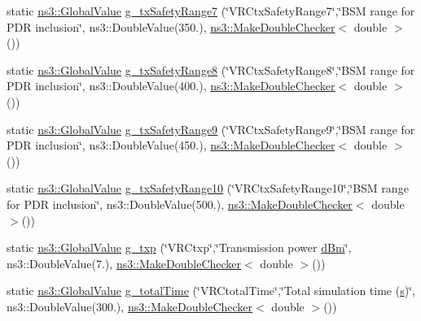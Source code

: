 \begin{DoxyCompactItemize}
\item 
static \hyperlink{classns3_1_1GlobalValue}{ns3\+::\+Global\+Value} \hyperlink{vanet-routing-compare_8cc_ac10de320e772d4158f5d1351ab282389}{g\+\_\+tx\+Safety\+Range7} (\char`\"{}V\+R\+Ctx\+Safety\+Range7\char`\"{},\char`\"{}B\+SM range for P\+DR inclusion\char`\"{}, ns3\+::\+Double\+Value(350.), \hyperlink{namespacens3_a0f8000e7b66dd988358648f0b16c7709}{ns3\+::\+Make\+Double\+Checker}$<$ double $>$())
\item 
static \hyperlink{classns3_1_1GlobalValue}{ns3\+::\+Global\+Value} \hyperlink{vanet-routing-compare_8cc_a920d83af661bf1ffdba301d10b2246fc}{g\+\_\+tx\+Safety\+Range8} (\char`\"{}V\+R\+Ctx\+Safety\+Range8\char`\"{},\char`\"{}B\+SM range for P\+DR inclusion\char`\"{}, ns3\+::\+Double\+Value(400.), \hyperlink{namespacens3_a0f8000e7b66dd988358648f0b16c7709}{ns3\+::\+Make\+Double\+Checker}$<$ double $>$())
\item 
static \hyperlink{classns3_1_1GlobalValue}{ns3\+::\+Global\+Value} \hyperlink{vanet-routing-compare_8cc_a6478672cb0ee8121ed2a8aefb62626aa}{g\+\_\+tx\+Safety\+Range9} (\char`\"{}V\+R\+Ctx\+Safety\+Range9\char`\"{},\char`\"{}B\+SM range for P\+DR inclusion\char`\"{}, ns3\+::\+Double\+Value(450.), \hyperlink{namespacens3_a0f8000e7b66dd988358648f0b16c7709}{ns3\+::\+Make\+Double\+Checker}$<$ double $>$())
\item 
static \hyperlink{classns3_1_1GlobalValue}{ns3\+::\+Global\+Value} \hyperlink{vanet-routing-compare_8cc_a01a56ff298e16d5824ba329baab1ff26}{g\+\_\+tx\+Safety\+Range10} (\char`\"{}V\+R\+Ctx\+Safety\+Range10\char`\"{},\char`\"{}B\+SM range for P\+DR inclusion\char`\"{}, ns3\+::\+Double\+Value(500.), \hyperlink{namespacens3_a0f8000e7b66dd988358648f0b16c7709}{ns3\+::\+Make\+Double\+Checker}$<$ double $>$())
\item 
static \hyperlink{classns3_1_1GlobalValue}{ns3\+::\+Global\+Value} \hyperlink{vanet-routing-compare_8cc_a9689fcc6cd4744bb0fee4559a7baef89}{g\+\_\+txp} (\char`\"{}V\+R\+Ctxp\char`\"{},\char`\"{}Transmission power \hyperlink{generate__test__data__lte__sinr_8m_a29e3c5e60f31e36ecdfd7ad769baea1c}{d\+Bm}\char`\"{}, ns3\+::\+Double\+Value(7.), \hyperlink{namespacens3_a0f8000e7b66dd988358648f0b16c7709}{ns3\+::\+Make\+Double\+Checker}$<$ double $>$())
\item 
static \hyperlink{classns3_1_1GlobalValue}{ns3\+::\+Global\+Value} \hyperlink{vanet-routing-compare_8cc_a28d96a7067e5b8e55c51f3c5087b100c}{g\+\_\+total\+Time} (\char`\"{}V\+R\+Ctotal\+Time\char`\"{},\char`\"{}Total simulation time (\hyperlink{generate__test__data__lte__sinr_8m_ad83eeb3a142285d1243a08c6b7026df8}{s})\char`\"{}, ns3\+::\+Double\+Value(300.), \hyperlink{namespacens3_a0f8000e7b66dd988358648f0b16c7709}{ns3\+::\+Make\+Double\+Checker}$<$ double $>$())

\end{DoxyCompactItemize}

